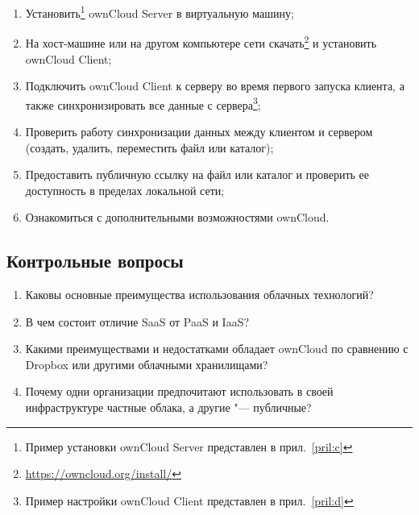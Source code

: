 \begin{enumerate}
    \item Установить\footnote{Пример установки ownCloud Server представлен в прил.~\ref{pril:c}} ownCloud Server в виртуальную машину;
    \item На хост-машине или на другом компьютере сети скачать\footnote{\url{https://owncloud.org/install/}} и установить ownCloud Client;
    \item Подключить ownCloud Client к серверу во время первого запуска клиента, а также синхронизировать все данные с сервера\footnote{Пример настройки ownCloud Client представлен в прил.~\ref{pril:d}};
    \item Проверить работу синхронизации данных между клиентом и сервером (создать, удалить, переместить файл или каталог);
    \item Предоставить публичную ссылку на файл или каталог и проверить ее доступность в пределах локальной сети;
    \item Ознакомиться с дополнительными возможностями ownCloud.
\end{enumerate}

\subsection{Контрольные вопросы}
\begin{enumerate}
    \item Каковы основные преимущества использования облачных технологий?
    \item В чем состоит отличие SaaS от PaaS и IaaS?
    \item Какими преимуществами и недостатками обладает ownCloud по сравнению с Dropbox или другими облачными хранилищами?
    \item Почему одни организации предпочитают использовать в своей инфраструктуре частные облака, а другие "--- публичные?
\end{enumerate}

\clearpage
